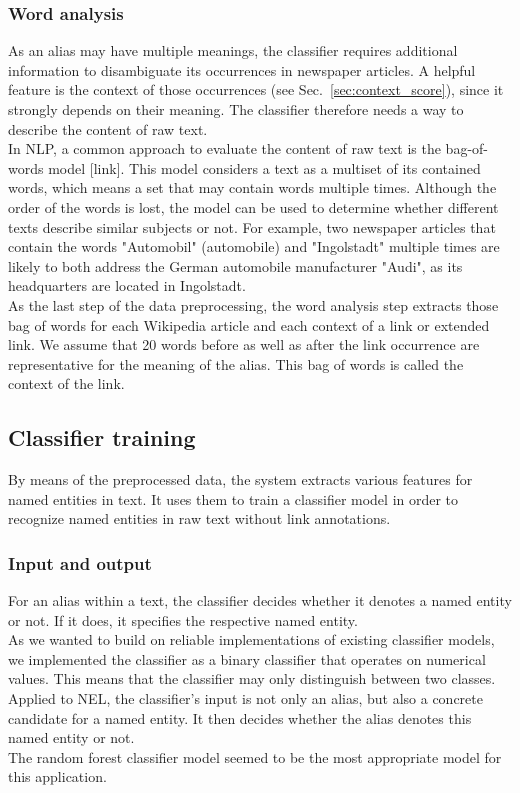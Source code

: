 \subsubsection{Word analysis}
As an alias may have multiple meanings, the classifier requires additional information to disambiguate its occurrences in newspaper articles. A helpful feature is the context of those occurrences (see Sec.~\ref{sec:context_score}), since it strongly depends on their meaning. The classifier therefore needs a way to describe the content of raw text.\\
In NLP, a common approach to evaluate the content of raw text is the bag-of-words model [link]. This model considers a text as a multiset of its contained words, which means a set that may contain words multiple times. Although the order of the words is lost, the model can be used to determine whether different texts describe similar subjects or not. For example, two newspaper articles that contain the words "Automobil" (automobile) and "Ingolstadt" multiple times are likely to both address the German automobile manufacturer "Audi", as its headquarters are located in Ingolstadt.\\
As the last step of the data preprocessing, the word analysis step extracts those bag of words for each Wikipedia article and each context of a link or extended link. We assume that 20 words before as well as after the link occurrence are representative for the meaning of the alias. This bag of words is called the context of the link.\\

\subsection{Classifier training}
By means of the preprocessed data, the system extracts various features for named entities in text. It uses them to train a classifier model in order to recognize named entities in raw text without link annotations.\\

\subsubsection{Input and output}
For an alias within a text, the classifier decides whether it denotes a named entity or not. If it does, it specifies the respective named entity.\\
As we wanted to build on reliable implementations of existing classifier models, we implemented the classifier as a binary classifier that operates on numerical values. This means that the classifier may only distinguish between two classes. Applied to NEL, the classifier's input is not only an alias, but also a concrete candidate for a named entity. It then decides whether the alias denotes this named entity or not.\\
The random forest classifier model seemed to be the most appropriate model for this application.\\

